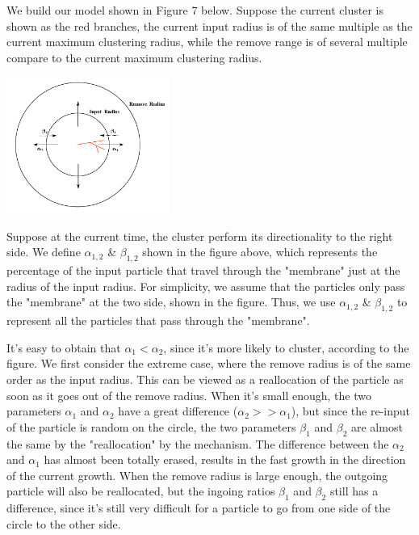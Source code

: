 \documentclass[10pt]{article}
\begin{document}
We build our model shown in Figure 7 below. Suppose the current cluster is shown as the red branches, the current input radius is of the same multiple as the current maximum clustering radius, while the remove range is of several multiple compare to the current maximum clustering radius.

\begin{center}
	\includegraphics[width=0.4\textwidth]{Figure_11}
\end{center}

Suppose at the current time, the cluster perform its directionality to the right side. We define $\alpha_{1,2}$ \& $\beta_{1,2}$ shown in the figure above, which represents the percentage of the input particle that travel through the "membrane" just at the radius of the input radius. For simplicity, we assume that the particles only pass the "membrane" at the two side, shown in the figure. Thus, we use $\alpha_{1,2}$ \& $\beta_{1,2}$ to represent all the particles that pass through the "membrane".

It's easy to obtain that $\alpha_{1} < \alpha_{2}$, since it's more likely to cluster, according to the figure. We first consider the extreme case, where the remove radius is of the same order as the input radius. This can be viewed as a reallocation of the particle as soon as it goes out of the remove radius. When it's small enough, the two parameters $\alpha_{1}$ and $\alpha_{2}$ have a great difference ($\alpha_{2} >> \alpha_{1}$), but since the re-input of the particle is random on the circle, the two parameters $\beta_{1}$ and $\beta_{2}$ are almost the same by the "reallocation" by the mechanism. The difference between the $\alpha_{2}$ and $\alpha_{1}$ has almost been totally erased, results in the fast growth in the direction of the current growth. When the remove radius is large enough, the outgoing particle will also be reallocated, but the ingoing ratios $\beta_{1}$ and $\beta_{2}$ still has a difference, since it's still very difficult for a particle to go from one side of the circle to the other side.
\end{document}
